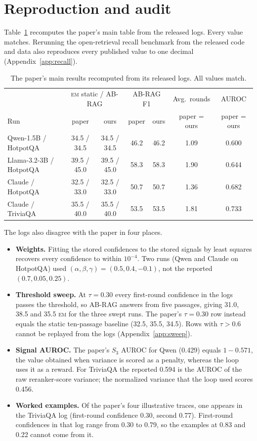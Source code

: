\documentclass[11pt]{article}
\newcommand{\EM}{\textsc{em}}
\begin{document}
\section{Reproduction and audit}
\label{sec:audit}

Table~\ref{tab:repro} recomputes the paper's main table from the released logs. Every value matches. Rerunning the open-retrieval recall benchmark from the released code and data also reproduces every published value to one decimal (Appendix~\ref{app:recall}).

\begin{table}[t]
\centering
\small
\begin{tabular}{lcccccc}
\toprule
& \multicolumn{2}{c}{\EM{} static / AB-RAG} & \multicolumn{2}{c}{AB-RAG F1} & Avg.\ rounds & AUROC \\
Run & paper & ours & paper & ours & paper = ours & paper = ours \\
\midrule
Qwen-1.5B / HotpotQA & 34.5 / 34.5 & 34.5 / 34.5 & 46.2 & 46.2 & 1.09 & 0.600 \\
Llama-3.2-3B / HotpotQA & 39.5 / 45.0 & 39.5 / 45.0 & 58.3 & 58.3 & 1.90 & 0.644 \\
Claude / HotpotQA & 32.5 / 33.0 & 32.5 / 33.0 & 50.7 & 50.7 & 1.36 & 0.682 \\
Claude / TriviaQA & 35.5 / 40.0 & 35.5 / 40.0 & 53.5 & 53.5 & 1.81 & 0.733 \\
\bottomrule
\end{tabular}
\caption{The paper's main results recomputed from its released logs. All values match.}
\label{tab:repro}
\end{table}

The logs also disagree with the paper in four places.
\begin{itemize}
\item \textbf{Weights.} Fitting the stored confidences to the stored signals by least squares recovers every confidence to within $10^{-4}$. Two runs (Qwen and Claude on HotpotQA) used $(\alpha,\beta,\gamma) = (0.5, 0.4, -0.1)$, not the reported $(0.7, 0.05, 0.25)$.
\item \textbf{Threshold sweep.} At $\tau = 0.30$ every first-round confidence in the logs passes the threshold, so AB-RAG answers from five passages, giving 31.0, 38.5 and 35.5 \EM{} for the three swept runs. The paper's $\tau = 0.30$ row instead equals the static ten-passage baseline (32.5, 35.5, 34.5). Rows with $\tau > 0.6$ cannot be replayed from the logs (Appendix~\ref{app:sweep}).
\item \textbf{Signal AUROC.} The paper's $S_3$ AUROC for Qwen (0.429) equals $1 - 0.571$, the value obtained when variance is scored as a penalty, whereas the loop uses it as a reward. For TriviaQA the reported 0.594 is the AUROC of the raw reranker-score variance; the normalized variance that the loop used scores 0.456.
\item \textbf{Worked examples.} Of the paper's four illustrative traces, one appears in the TriviaQA log (first-round confidence 0.30, second 0.77). First-round confidences in that log range from 0.30 to 0.79, so the examples at 0.83 and 0.22 cannot come from it.
\end{itemize}
\end{document}
